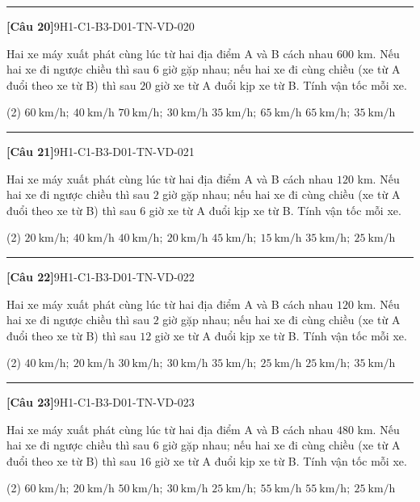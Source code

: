 \documentclass[12pt,a4paper]{article}
\newif\ifloigiai
\newenvironment{cauhoi}[2]{%
  \par\medskip\noindent\rule{\textwidth}{0.4pt}\par\nopagebreak
  \noindent\textbf{[#1]}\hfill{\scriptsize\ttfamily #2}\par\nopagebreak\smallskip}{\par}
\newcommand{\dapan}[1]{\ifloigiai\par\smallskip\noindent\textit{Đáp án:} \textbf{#1}\par\fi}
\begin{document}
\begin{cauhoi}{Câu 20}{9H1-C1-B3-D01-TN-VD-020}
Hai xe máy xuất phát cùng lúc từ hai địa điểm A và B cách nhau $600$ km. Nếu hai xe đi ngược chiều thì sau $6$ giờ gặp nhau; nếu hai xe đi cùng chiều (xe từ A đuổi theo xe từ B) thì sau $20$ giờ xe từ A đuổi kịp xe từ B. Tính vận tốc mỗi xe.
\begin{tasks}(2)
\task $60\ \text{km/h};\ 40\ \text{km/h}$
\task $70\ \text{km/h};\ 30\ \text{km/h}$
\task $35\ \text{km/h};\ 65\ \text{km/h}$
\task $65\ \text{km/h};\ 35\ \text{km/h}$
\end{tasks}
\dapan{D}
\end{cauhoi}
\begin{cauhoi}{Câu 21}{9H1-C1-B3-D01-TN-VD-021}
Hai xe máy xuất phát cùng lúc từ hai địa điểm A và B cách nhau $120$ km. Nếu hai xe đi ngược chiều thì sau $2$ giờ gặp nhau; nếu hai xe đi cùng chiều (xe từ A đuổi theo xe từ B) thì sau $6$ giờ xe từ A đuổi kịp xe từ B. Tính vận tốc mỗi xe.
\begin{tasks}(2)
\task $20\ \text{km/h};\ 40\ \text{km/h}$
\task $40\ \text{km/h};\ 20\ \text{km/h}$
\task $45\ \text{km/h};\ 15\ \text{km/h}$
\task $35\ \text{km/h};\ 25\ \text{km/h}$
\end{tasks}
\dapan{B}
\end{cauhoi}
\begin{cauhoi}{Câu 22}{9H1-C1-B3-D01-TN-VD-022}
Hai xe máy xuất phát cùng lúc từ hai địa điểm A và B cách nhau $120$ km. Nếu hai xe đi ngược chiều thì sau $2$ giờ gặp nhau; nếu hai xe đi cùng chiều (xe từ A đuổi theo xe từ B) thì sau $12$ giờ xe từ A đuổi kịp xe từ B. Tính vận tốc mỗi xe.
\begin{tasks}(2)
\task $40\ \text{km/h};\ 20\ \text{km/h}$
\task $30\ \text{km/h};\ 30\ \text{km/h}$
\task $35\ \text{km/h};\ 25\ \text{km/h}$
\task $25\ \text{km/h};\ 35\ \text{km/h}$
\end{tasks}
\dapan{C}
\end{cauhoi}
\begin{cauhoi}{Câu 23}{9H1-C1-B3-D01-TN-VD-023}
Hai xe máy xuất phát cùng lúc từ hai địa điểm A và B cách nhau $480$ km. Nếu hai xe đi ngược chiều thì sau $6$ giờ gặp nhau; nếu hai xe đi cùng chiều (xe từ A đuổi theo xe từ B) thì sau $16$ giờ xe từ A đuổi kịp xe từ B. Tính vận tốc mỗi xe.
\begin{tasks}(2)
\task $60\ \text{km/h};\ 20\ \text{km/h}$
\task $50\ \text{km/h};\ 30\ \text{km/h}$
\task $25\ \text{km/h};\ 55\ \text{km/h}$
\task $55\ \text{km/h};\ 25\ \text{km/h}$
\end{tasks}
\dapan{D}
\end{cauhoi}
\end{document}
